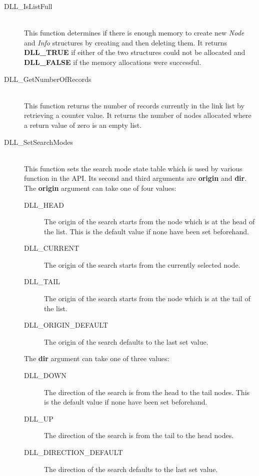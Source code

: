 \documentclass[10pt,letterpaper,titlepage]{article}
\begin{document}
\begin{description}
\begin{description}
\item[DLL\_IsListFull]\quad\\
 This function determines if there is enough memory to create new \emph{Node} and \emph{Info} structures by creating and then deleting them.  It returns \textbf{DLL\_TRUE} if either of the two structures could not be allocated and \textbf{DLL\_FALSE} if the memory allocations were successful.

\item[DLL\_GetNumberOfRecords]\quad\\
 This function returns the number of records currently in the link list by retrieving a counter value.  It returns the number of nodes allocated where a return value of zero is an empty list.

\item[DLL\_SetSearchModes]\quad\\
 This function sets the search mode state table which is used by various function in the API.  Its second and third arguments are \textbf{origin} and \textbf{dir}.  The \textbf{origin} argument can take one of four values:

\begin{description}
\item[DLL\_HEAD] The origin of the search starts from the node which is at the head of the list.  This is the default value if none have been set beforehand.
\item[DLL\_CURRENT] The origin of the search starts from the currently selected node.
\item[DLL\_TAIL] The origin of the search starts from the node which is at the tail of the list.
\item[DLL\_ORIGIN\_DEFAULT] The origin of the search defaults to the last set value.
\end{description}

 The \textbf{dir} argument can take one of three values:

\begin{description}
\item[DLL\_DOWN] The direction of the search is from the head to the tail nodes.  This is the default value if none have been set beforehand.
\item[DLL\_UP] The direction of the search is from the tail to the head nodes.
\item[DLL\_DIRECTION\_DEFAULT] The direction of the search defaults to the last set value.
\end{description}


\end{description}
\end{description}
\end{document}
